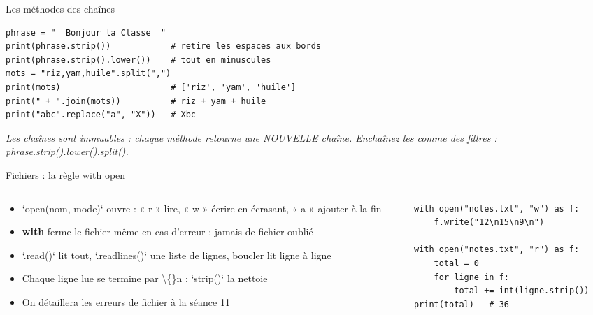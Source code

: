 \documentclass[aspectratio=169,11pt]{beamer}
\begin{document}
\begin{frame}[fragile]{Les méthodes des chaînes}

\begin{lstlisting}[style=py]
phrase = "  Bonjour la Classe  "
print(phrase.strip())            # retire les espaces aux bords
print(phrase.strip().lower())    # tout en minuscules
mots = "riz,yam,huile".split(",")
print(mots)                      # ['riz', 'yam', 'huile']
print(" + ".join(mots))          # riz + yam + huile
print("abc".replace("a", "X"))   # Xbc
\end{lstlisting}
\vspace{0.5pt}

{\small\color{PyGris}\itshape Les chaînes sont immuables : chaque méthode retourne une NOUVELLE chaîne. Enchaînez les comme des filtres : phrase.strip().lower().split().}

\end{frame}

\begin{frame}[fragile]{Fichiers : la règle with open}
\begin{columns}[t]
\begin{column}{0.42\textwidth}
\begin{itemize}
  \setlength{\itemsep}{1.5pt}\setlength{\parskip}{0pt}
  \item `open(nom, mode)` ouvre : « r » lire, « w » écrire en écrasant, « a » ajouter à la fin
  \item \textbf{with} ferme le fichier même en cas d'erreur : jamais de fichier oublié
  \item `.read()` lit tout, `.readlines()` une liste de lignes, boucler lit ligne à ligne
  \item Chaque ligne lue se termine par \textbackslash\{\}n : `strip()` la nettoie
  \item On détaillera les erreurs de fichier à la séance 11
\end{itemize}
\end{column}
\hspace{0.02\textwidth}
\begin{column}{0.55\textwidth}
\begin{lstlisting}[style=pysmall]
with open("notes.txt", "w") as f:
    f.write("12\n15\n9\n")

with open("notes.txt", "r") as f:
    total = 0
    for ligne in f:
        total += int(ligne.strip())
print(total)   # 36
\end{lstlisting}
\end{column}
\end{columns}
\end{frame}
\end{document}
